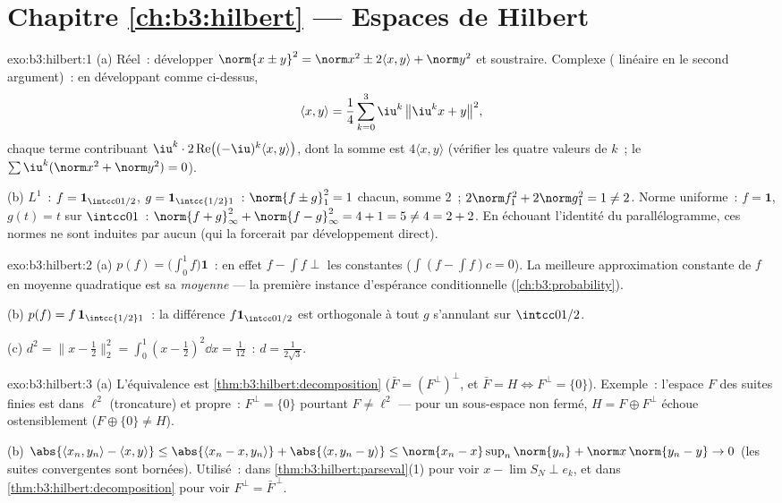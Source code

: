 \section*{Chapitre \ref{ch:b3:hilbert} --- Espaces de Hilbert}

\begin{solution}{exo:b3:hilbert:1}
(a) Réel~: développer $\norm{x \pm y}^2 = \norm x^2 \pm 2\langle
x,y\rangle + \norm y^2$ et soustraire. Complexe ( linéaire en le second argument)~: en développant comme
ci-dessus,
\[
\langle x, y\rangle = \frac14\sum_{k=0}^{3}
\iu^k\,\bigl\|\iu^kx + y\bigr\|^2,
\]
chaque terme contribuant $\iu^k\cdot2\operatorname{Re}\bigl(
(-\iu)^k\langle x,y\rangle\bigr)$, dont la somme est $4\langle
x,y\rangle$ (vérifier les quatre valeurs de $k$~; le
$\sum\iu^k (\norm x^2 + \norm y^2) = 0$).

(b) $L^1$~: $f = \mathbf 1_{\intcc0{1/2}}$, $g = \mathbf
1_{\intcc{1/2}1}$~: $\norm{f\pm g}_1^2 = 1$ chacun, somme $2$~;
$2\norm f_1^2 + 2\norm g_1^2 = 1 \neq 2$. Norme uniforme~: $f =
\mathbf 1$, $g(t) = t$ sur $\intcc01$~: $\norm{f + g}_\infty^2 +
\norm{f-g}_\infty^2 = 4 + 1 = 5 \neq 4 = 2 + 2$. En échouant
l'identité du parallélogramme, ces normes ne sont induites par
aucun  (qui la forcerait par développement
direct).
\end{solution}

\begin{solution}{exo:b3:hilbert:2}
(a) $p(f) = \bigl(\int_0^1f\bigr)\mathbf 1$~: en effet $f - \int f
\perp$ les constantes ($\int(f - \int f)c = 0$). La meilleure
approximation constante de $f$ en moyenne quadratique est sa
\emph{moyenne} --- la première instance d'espérance conditionnelle
(\cref{ch:b3:probability}).

(b) $p(f) = f\,\mathbf 1_{\intcc{1/2}1}$~: la différence
$f\mathbf 1_{\intcc0{1/2}}$ est orthogonale à tout $g$
s'annulant sur $\intcc0{1/2}$.

(c) $d^2 = \bigl\|x - \tfrac12\bigr\|_2^2 = \int_0^1(x -
\tfrac12)^2\dd x = \tfrac1{12}$~: $d = \frac1{2\sqrt3}$.
\end{solution}

\begin{solution}{exo:b3:hilbert:3}
(a) L'équivalence est \cref{thm:b3:hilbert:decomposition}
($\bar F = (F^\perp)^\perp$, et $\bar F = H \iff F^\perp =
\{0\}$). Exemple~: l'espace $F$ des suites finies est 
dans $\ell^2$ (troncature) et propre~: $F^\perp = \{0\}$
pourtant $F \neq \ell^2$ --- pour un sous-espace non fermé, $H
= F \oplus F^\perp$ échoue ostensiblement ($F \oplus \{0\}
\neq H$).

(b) $\abs{\langle x_n, y_n\rangle - \langle x, y\rangle} \leq
\abs{\langle x_n - x, y_n\rangle} + \abs{\langle x, y_n -
y\rangle} \leq \norm{x_n - x}\sup_n\norm{y_n} + \norm
x\,\norm{y_n - y} \to 0$ (les suites convergentes sont
bornées). Utilisé~: dans \cref{thm:b3:hilbert:parseval}(1)
pour voir $x - \lim S_N \perp e_k$, et dans
\cref{thm:b3:hilbert:decomposition} pour voir $F^\perp =
\bar F^{\,\perp}$.
\end{solution}

